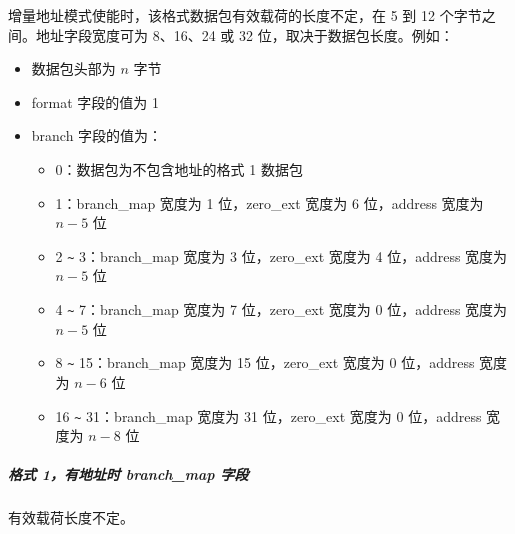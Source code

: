 \documentclass[main\_\_CN.tex]{subfiles}
\begin{document}
增量地址模式使能时，该格式数据包有效载荷的长度不定，在 5 到 12 个字节之间。地址字段宽度可为 8、16、24 或 32 位，取决于数据包长度。例如：
\begin{itemize}
    \item 数据包头部为 $n$ 字节
    \item format 字段的值为 1
    \item branch 字段的值为：
        \begin{itemize}
            \item 0：数据包为不包含地址的格式 1 数据包
            \item 1：branch\_map 宽度为 1 位，zero\_ext 宽度为 6 位，address 宽度为 $n-5$ 位
            \item 2 \verb+~+ 3：branch\_map 宽度为 3 位，zero\_ext 宽度为 4 位，address 宽度为 $n-5$ 位
            \item 4 \verb+~+ 7：branch\_map 宽度为 7 位，zero\_ext 宽度为 0 位，address 宽度为 $n-5$ 位
            \item 8 \verb+~+ 15：branch\_map 宽度为 15 位，zero\_ext 宽度为 0 位，address 宽度为 $n-6$ 位
            \item 16 \verb+~+ 31：branch\_map 宽度为 31 位，zero\_ext 宽度为 0 位，address 宽度为 $n-8$ 位
        \end{itemize}
\end{itemize}


\subparagraph{格式 1，有地址时 branch\_map 字段}


有效载荷长度不定。
\end{document}
